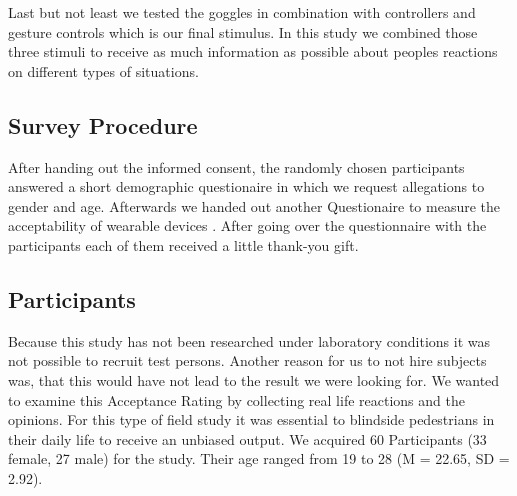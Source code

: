 \documentclass[sigchi]{acmart}
\begin{document}
 Last but not least we tested the goggles in combination with controllers and gesture controls which is our final stimulus. In this study we combined those three stimuli to receive as much information as possible about peoples reactions on different types of situations.

\subsection{Survey Procedure}

After handing out the informed consent, the randomly chosen participants answered a short demographic questionaire in which we request allegations to gender and age. Afterwards we handed out another Questionaire to measure the acceptability of wearable devices \cite{kelly2016wear}. After going over the questionnaire with the participants each of them received a little thank-you gift.

\subsection{Participants}

Because this study has not been researched under laboratory conditions it was not possible to recruit test persons. Another reason for us to not hire subjects was, that this would have not lead to the result we were looking for. We wanted to examine this Acceptance Rating by collecting real life reactions and the opinions. For this type of field study it was essential to blindside pedestrians in their daily life to receive an unbiased output. We acquired 60 Participants (33 female, 27 male) for the study. Their age ranged from 19 to 28 (M = 22.65, SD = 2.92).
\end{document}
